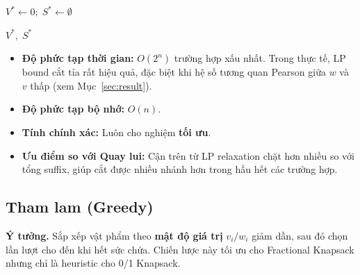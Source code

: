 \documentclass[fontsize=13pt,a4paper]{report}
\begin{document}
\begin{algorithm}[H]
\caption{Nhánh cận cho 0/1 Knapsack}
\label{alg:bnb}
$V^* \leftarrow 0;\; S^* \leftarrow \emptyset$\;


\;
\Return $V^*,\; S^*$\;
\end{algorithm}

\begin{itemize}[noitemsep]
    \item \textbf{Độ phức tạp thời gian:} $O(2^n)$ trường hợp xấu nhất. Trong thực tế, LP bound cắt tỉa rất hiệu quả, đặc biệt khi hệ số tương quan Pearson giữa $w$ và $v$ thấp (xem Mục~\ref{sec:result}).
    \item \textbf{Độ phức tạp bộ nhớ:} $O(n)$.
    \item \textbf{Tính chính xác:} Luôn cho nghiệm \textbf{tối ưu}.
    \item \textbf{Ưu điểm so với Quay lui:} Cận trên từ LP relaxation chặt hơn nhiều so với tổng suffix, giúp cắt được nhiều nhánh hơn trong hầu hết các trường hợp.
\end{itemize}


\subsection{Tham lam (Greedy)}

\textbf{Ý tưởng.} Sắp xếp vật phẩm theo \textbf{mật độ giá trị} $v_i / w_i$ giảm dần, sau đó chọn lần lượt cho đến khi hết sức chứa. Chiến lược này tối ưu cho Fractional Knapsack nhưng chỉ là heuristic cho 0/1 Knapsack.
\end{document}
